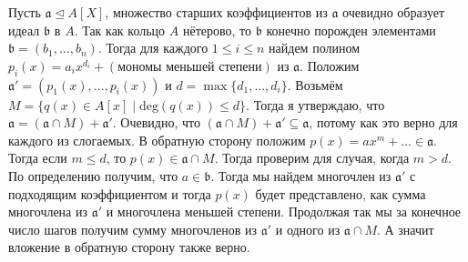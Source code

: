 \documentclass{article}
\begin{document}
\begin{enumerate}
        Пусть $\mathfrak{a}\trianglelefteq A[X]$, множество старших коэффициентов
        из $\mathfrak{a}$ очевидно образует идеал $\mathfrak{b}$ в $A$. Так как
        кольцо $A$ нётерово, то $\mathfrak{b}$ конечно порожден элементами
        $\mathfrak{b}=(b_1,\ldots,b_n)$. Тогда для каждого $1\leq i\leq n$
        найдем полином $p_i(x) = a_ix^{d_i} + (\text{мономы меньшей степени})$
        из $\mathfrak{a}$. Положим $\mathfrak{a}'=(p_1(x),\ldots,p_i(x))$ и $
        d=\max\{d_1,\ldots,d_i\}$. Возьмём $M=\{q(x)\in A[x]\;|\;\text{deg}(q(x))
        \leq d\}$. Тогда я утверждаю, что $\mathfrak{a}=(\mathfrak{a}\cap M)+
        \mathfrak{a}'$. Очевидно, что $(\mathfrak{a}\cap M)+\mathfrak{a}'\subseteq
        \mathfrak{a}$, потому как это верно для каждого из слогаемых. В обратную
        сторону положим $p(x)=ax^m+\ldots\in\mathfrak{a}$. Тогда если $m\leq d$,
        то $p(x)\in\mathfrak{a}\cap M$. Тогда проверим для случая, когда $m>d$.
        По определению получим, что $a\in\mathfrak{b}$. Тогда мы найдем
        многочлен из $\mathfrak{a}'$ с подходящим коэффициентом и тогда $p(x)$
        будет представлено, как сумма многочлена из $\mathfrak{a}'$ и
        многочлена меньшей степени. Продолжая так мы за конечное число шагов
        получим сумму многочленов из $\mathfrak{a}'$ и одного из $\mathfrak{a}
        \cap M$. А значит вложение в обратную сторону также верно.

\end{enumerate}
\end{document}
